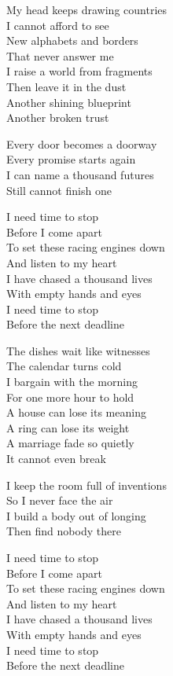 \begin{lyrics}
My head keeps drawing countries\\
I cannot afford to see\\
New alphabets and borders\\
That never answer me\\
I raise a world from fragments\\
Then leave it in the dust\\
Another shining blueprint\\
Another broken trust

Every door becomes a doorway\\
Every promise starts again\\
I can name a thousand futures\\
Still cannot finish one

I need time to stop\\
Before I come apart\\
To set these racing engines down\\
And listen to my heart\\
I have chased a thousand lives\\
With empty hands and eyes\\
I need time to stop\\
Before the next deadline

The dishes wait like witnesses\\
The calendar turns cold\\
I bargain with the morning\\
For one more hour to hold\\
A house can lose its meaning\\
A ring can lose its weight\\
A marriage fade so quietly\\
It cannot even break

I keep the room full of inventions\\
So I never face the air\\
I build a body out of longing\\
Then find nobody there

I need time to stop\\
Before I come apart\\
To set these racing engines down\\
And listen to my heart\\
I have chased a thousand lives\\
With empty hands and eyes\\
I need time to stop\\
Before the next deadline


\end{lyrics}

